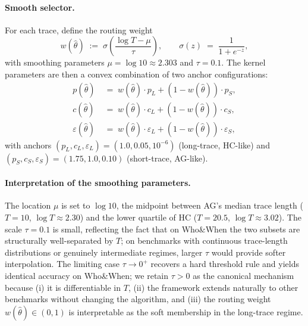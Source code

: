 \documentclass[11pt]{article}
\newcommand{\thetahat}{\hat{\theta}}
\begin{document}
\paragraph{Smooth selector.}
For each trace, define the routing weight
\begin{equation}
w(\thetahat) \;:=\; \sigma\!\left(\frac{\log T - \mu}{\tau}\right),
\qquad
\sigma(z) \;=\; \frac{1}{1 + e^{-z}},
\label{eq:smooth-selector}
\end{equation}
with smoothing parameters $\mu = \log 10 \approx 2.303$ and
$\tau = 0.1$. The kernel parameters are then a convex combination of
two anchor configurations:
\begin{equation}
\begin{aligned}
p(\thetahat)         &\;=\; w(\thetahat) \cdot p_L         + (1 - w(\thetahat)) \cdot p_S, \\
c(\thetahat)         &\;=\; w(\thetahat) \cdot c_L         + (1 - w(\thetahat)) \cdot c_S, \\
\varepsilon(\thetahat) &\;=\; w(\thetahat) \cdot \varepsilon_L + (1 - w(\thetahat)) \cdot \varepsilon_S,
\end{aligned}
\label{eq:cfg-interp}
\end{equation}
with anchors $(p_L, c_L, \varepsilon_L) = (1.0, 0.05, 10^{-6})$
(long-trace, HC-like) and $(p_S, c_S, \varepsilon_S) = (1.75, 1.0, 0.10)$
(short-trace, AG-like).

\paragraph{Interpretation of the smoothing parameters.}
The location $\mu$ is set to $\log 10$, the midpoint between AG's median
trace length ($T = 10$, $\log T \approx 2.30$) and the lower quartile of
HC ($T = 20.5$, $\log T \approx 3.02$). The scale $\tau = 0.1$ is small,
reflecting the fact that on Who\&When the two subsets are structurally
well-separated by $T$; on benchmarks with continuous trace-length
distributions or genuinely intermediate regimes, larger $\tau$ would
provide softer interpolation. The limiting case $\tau \to 0^+$ recovers
a hard threshold rule and yields identical accuracy on Who\&When; we
retain $\tau > 0$ as the canonical mechanism because (i) it is
differentiable in $T$, (ii) the framework extends naturally to other
benchmarks without changing the algorithm, and (iii) the routing weight
$w(\thetahat) \in (0, 1)$ is interpretable as the soft membership in the
long-trace regime.
\end{document}
